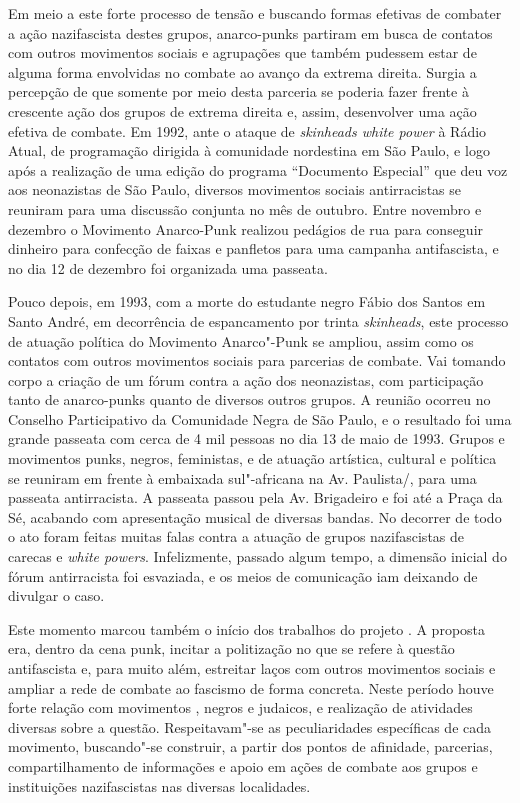 Em meio a este forte processo de tensão e buscando formas efetivas de combater a ação nazifascista destes grupos, anarco-punks partiram em busca de contatos com outros movimentos sociais e agrupações que também pudessem estar de alguma forma envolvidas no combate ao avanço da extrema direita. Surgia a percepção de que somente por meio desta parceria se poderia fazer frente à crescente ação dos grupos de extrema direita e, assim, desenvolver uma ação efetiva de combate. Em 1992, ante o ataque de \emph{skinheads white power} à Rádio Atual, de programação dirigida à comunidade nordestina em São Paulo, e logo após a realização de uma edição do programa ``Documento Especial'' que deu voz aos neonazistas de São Paulo, diversos movimentos sociais antirracistas se reuniram para uma discussão conjunta no mês de outubro. Entre novembro e dezembro o Movimento Anarco-Punk realizou pedágios de rua para conseguir dinheiro para confecção de faixas e panfletos para uma campanha antifascista, e no dia 12 de dezembro foi organizada uma passeata.

Pouco depois, em 1993, com a morte do estudante negro Fábio dos Santos em Santo André, em decorrência de espancamento por trinta \emph{skinheads}, este processo de atuação política do Movimento Anarco"-Punk se ampliou, assim como os contatos com outros movimentos sociais para parcerias de combate. Vai tomando corpo a criação de um fórum contra a ação dos neonazistas, com participação tanto de anarco-punks quanto de diversos outros grupos. A reunião ocorreu no Conselho Participativo da Comunidade Negra de São Paulo, e o resultado foi uma grande passeata com cerca de 4 mil pessoas no dia 13 de maio de 1993. Grupos e movimentos punks, negros, feministas, e de atuação artística, cultural e política se reuniram em frente à embaixada sul"-africana na Av. Paulista/, para uma passeata antirracista. A passeata passou pela Av. Brigadeiro e foi até a Praça da Sé, acabando com apresentação musical de diversas bandas.  No decorrer de todo o ato foram feitas muitas falas contra a atuação de grupos nazifascistas de carecas e \emph{white powers}. Infelizmente, passado algum tempo, a dimensão inicial do fórum antirracista foi esvaziada, e os meios de comunicação iam deixando de divulgar o caso.

Este momento marcou também o início dos trabalhos do projeto . A proposta era, dentro da cena punk, incitar a politização no que se refere à questão antifascista e, para muito além, estreitar laços com outros movimentos sociais e ampliar a rede de combate ao fascismo de forma concreta. Neste período houve forte relação com movimentos , negros e judaicos, e realização de atividades diversas sobre a questão. Respeitavam"-se as peculiaridades específicas de cada movimento, buscando"-se construir, a partir dos pontos de afinidade, parcerias, compartilhamento de informações e apoio em ações de combate aos grupos e instituições nazifascistas nas diversas localidades.

